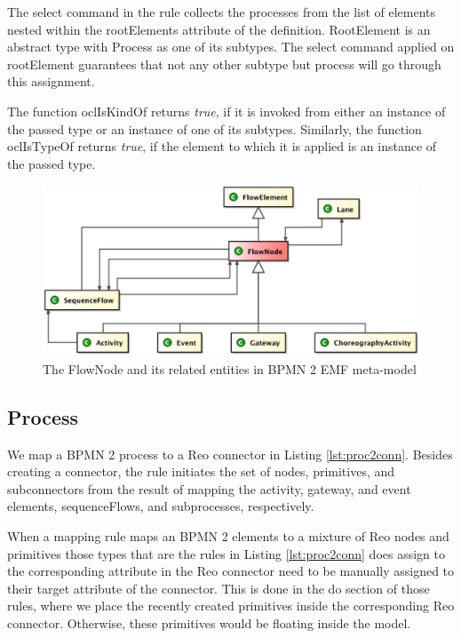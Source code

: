 The {select} command in the rule collects the {process}es from the list of elements nested within the {rootElements} attribute of the definition.
{RootElement} is an abstract type with {Process} as one of its subtypes. The {select} command applied on {rootElement} guarantees that not any other subtype but {process} will go through this assignment. 

The function {oclIsKindOf} returns \emph{true}, if it is invoked from  either an instance of the passed type or an instance of one of its subtypes. Similarly, the function {oclIsTypeOf} returns \emph{true}, if the element to which it is applied is an instance of the passed type.

\begin{figure}[!t]
  \includegraphics[width=.95\linewidth]{img/emf-flownode}
  \caption[The meta-model of {FlowNode}]{The {FlowNode} and its related entities in BPMN 2 EMF meta-model }
  \label{fig:emfflownode}
\end{figure}

\subsection{Process}
We map a BPMN 2 {process} to a Reo {connector} in Listing \ref{lst:proc2conn}. Besides creating a {connector}, the rule initiates the set of {node}s, {primitive}s, and {subconnector}s from the result of mapping the {activity}, {gateway}, and {event} elements, {sequenceFlow}s, and {subprocess}es, respectively. 

When a mapping rule maps an BPMN 2 elements to a mixture of Reo nodes and primitives those types that are the rules in Listing \ref{lst:proc2conn} does assign to the corresponding attribute in the Reo connector need to be manually assigned to their target attribute of the connector. This is done in the {do} section of those rules, where we place the recently created primitives inside the corresponding Reo connector. Otherwise, these primitives would be floating inside the model.

